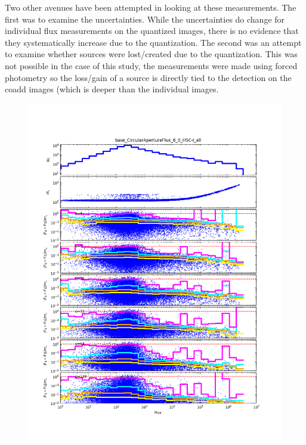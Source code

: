 Two other avenues have been attempted in looking at these measurements.  The first was to examine the 
uncertainties.  While the uncertainties do change for individual flux measurements on the quantized 
images, there is no evidence that they systematically increase due to the quantization.  The second was
an attempt to examine whether sources were lost/created due to the quantization.  This was not possible
in the case of this study, the measurements were made using forced photometry so the loss/gain of a 
source is directly tied to the detection on the coadd images (which is deeper than
the individual images.

\begin{figure}[t]
\centering
    \begin{minipage}{.49\textwidth}
        \centering
        \includegraphics[width=1.0\textwidth]{figure/rplot_all_base_CircularApertureFlux_6_0_HSC-I.png}
    \end{minipage}

\end{figure}

